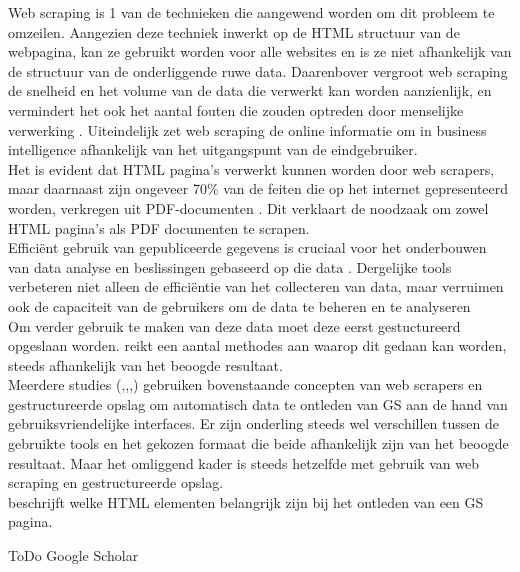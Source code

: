 Web scraping is 1 van de technieken die aangewend worden om dit probleem te omzeilen. Aangezien deze techniek inwerkt op de HTML structuur van de webpagina, kan ze gebruikt worden voor alle websites en is ze niet afhankelijk van de structuur van de onderliggende ruwe data. Daarenbover vergroot web scraping de snelheid en het volume van de data die verwerkt kan worden aanzienlijk, en vermindert het ook het aantal fouten die zouden optreden door menselijke verwerking \autocite{Bhatt2023}. Uiteindelijk zet web scraping de online informatie om in business intelligence afhankelijk van het uitgangspunt van de eindgebruiker.\\
Het is evident dat HTML pagina's verwerkt kunnen worden door web scrapers, maar daarnaast zijn ongeveer 70\% van de feiten die op het internet gepresenteerd worden, verkregen uit PDF-documenten \autocite{Singrodia2019}. Dit verklaart de noodzaak om zowel HTML pagina's als PDF documenten te scrapen.\\



Efficiënt gebruik van gepubliceerde gegevens is cruciaal voor het onderbouwen van data analyse en beslissingen gebaseerd op die data \autocite{NurDalila2023}. Dergelijke tools verbeteren niet alleen de efficiëntie van het collecteren van data, maar verruimen ook de capaciteit van de gebruikers om de data te beheren en te analyseren \textcite{Toth2024}\\


Om verder gebruik te maken van deze data moet deze eerst gestuctureerd opgeslaan worden. \textcite{Mitchell2015} reikt een aantal methodes aan waarop dit gedaan kan worden, steeds afhankelijk van het beoogde resultaat.\\
Meerdere studies (\autocite{Pratiba2018},\autocite{Rafsanjani2022},\autocite{Amin2024},\autocite{Sulistya2024}) gebruiken bovenstaande concepten van web scrapers en gestructureerde opslag om automatisch data te ontleden van GS aan de hand van gebruiksvriendelijke interfaces. Er zijn onderling steeds wel verschillen tussen de gebruikte tools en het gekozen formaat die beide afhankelijk zijn van het beoogde resultaat. Maar het omliggend kader is steeds hetzelfde met gebruik van web scraping en gestructureerde opslag.\\
\textcite{Yang2017} beschrijft welke HTML elementen belangrijk zijn bij het ontleden van een GS pagina.

ToDo Google Scholar\\


